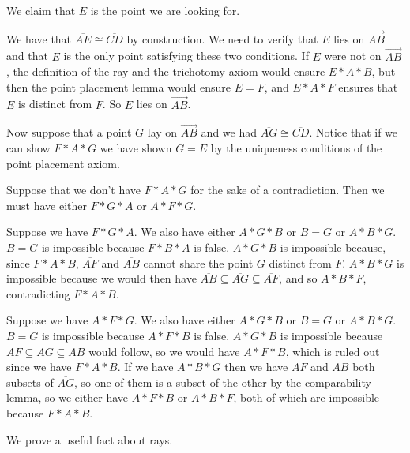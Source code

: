 \documentclass[12pt]{article}
\begin{document}
\begin{description}
We claim that $E$ is the point we are looking for.

We have that $\overline{AE} \cong \overline{CD}$ by construction.  We need to verify that $E$ lies on $\overrightarrow{AB}$ and that $E$ is the only point satisfying these two conditions.
If $E$ were not on  $\overrightarrow{AB}$, the definition of the ray and the trichotomy axiom  would ensure $E*A*B$, but then the point placement lemma would ensure $E=F$,
and $E*A*F$ ensures that $E$ is distinct from $F$.  So $E$ lies on $\overrightarrow{AB}$.

Now suppose that a point $G$ lay on $\overrightarrow{AB}$ and we had $\overline{AG} \cong \overline{CD}$.  Notice that if we can show $F*A*G$ we have shown $G=E$ by the uniqueness conditions of the point placement axiom.

Suppose that we don't have $F*A*G$ for the sake of a contradiction.  Then we must have either $F*G*A$ or $A*F*G$.

Suppose we have $F*G*A$.  We also have either $A*G*B$ or $B=G$ or $A*B*G$.  $B=G$ is impossible because $F*B*A$ is false.  $A*G*B$ is impossible because, since
$F*A*B$, $\overline{AF}$ and $\overline{AB}$ cannot share the point $G$ distinct from $F$.  $A*B*G$ is impossible because we would then have $\overline{AB} \subseteq \overline{AG} \subseteq \overline{AF}$, and so $A*B*F$, contradicting $F*A*B$.

Suppose we have $A*F*G$.  We also have either $A*G*B$ or $B=G$ or $A*B*G$.  $B=G$ is impossible because $A*F*B$ is false.  $A*G*B$ is impossible because  $\overline{AF} \subseteq \overline{AG} \subseteq \overline{AB}$ would follow, so we would have $A*F*B$, which is ruled out since we have $F*A*B$.   If we have $A*B*G$ then we have
$\overline{AF}$  and $\overline{AB}$ both subsets of $\overline{AG}$, so one of them is a subset of the other by the comparability lemma, so we either have
$A*F*B$ or $A*B*F$, both of which are impossible because $F*A*B$.

\end{description}

We prove a useful fact about rays.
\end{document}
